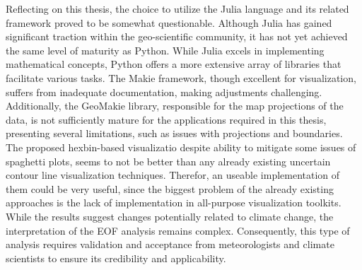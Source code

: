 %
%

Reflecting on this thesis, the choice to utilize the Julia language and its related framework proved to be somewhat questionable. 
Although Julia has gained significant traction within the geo-scientific community, it has not yet achieved the same level of maturity as Python. 
While Julia excels in implementing mathematical concepts, Python offers a more extensive array of libraries that facilitate various tasks.
The Makie framework, though excellent for visualization, suffers from inadequate documentation, making adjustments challenging. 
Additionally, the GeoMakie library, responsible for the map projections of the data, is not sufficiently mature for the applications required in this thesis, presenting several limitations, such as issues with projections and boundaries.
The proposed hexbin-based visualizatio despite ability to mitigate some issues of spaghetti plots, seems to not be better than any already existing uncertain contour line visualization techniques.
Therefor, an useable implementation of them could be very useful, since the biggest problem of the already existing approaches is the lack of implementation in all-purpose visualization toolkits.
While the results suggest changes potentially related to climate change, the interpretation of the EOF analysis remains complex. 
Consequently, this type of analysis requires validation and acceptance from meteorologists and climate scientists to ensure its credibility and applicability.

